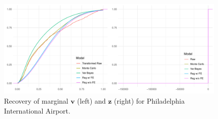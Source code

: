 \begin{figure}[ht]
    \caption{Recovery of marginal $\bm{v}$ (left) and $\bm{z}$ (right) for 
        Philadelphia International Airport.
        \label{plot:marginal_pia}}
    \centering
    \includegraphics[width=\textwidth]{./plots/delaware_marginal_phil_ia}
\end{figure}

